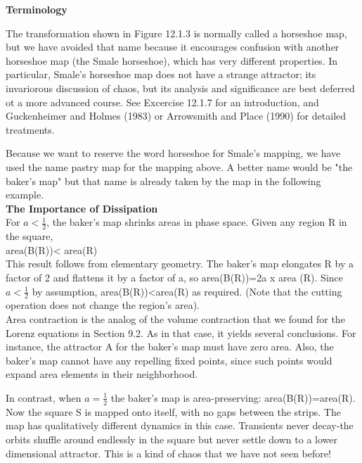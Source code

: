 \documentclass{article}
\newcommand\tab[1][1cm]{\hspace*{#1}}
\begin{document}
\textbf {Terminology} \\ \tab

The transformation shown in Figure 12.1.3 is normally called a horseshoe map, but we have avoided that name because it encourages confusion with another horseshoe map (the Smale horseshoe), which has very different properties. In particular, Smale's horseshoe map does not have a strange attractor; its invariorous discussion of chaos, but its analysis and significance are best deferred ot a more advanced course. See Excercise 12.1.7 for an introduction, and Guckenheimer and Holmes (1983) or Arrowsmith and Place (1990) for detailed treatments. \\ \tab

Because we want to reserve the word horseshoe for Smale's mapping, we have used the name pastry map for the mapping above. A better name would be "the baker's map" but that name is already taken by the map in the following example. \\

\textbf{The Importance of Dissipation} \\

For $a< \frac{1}{2}$, the baker's map shrinks areas in phase space. Given any region R in the square, \\ \tab \tab
area(B(R))< area(R) \\

This result follows from elementary geometry. The baker's map elongates R by a factor of 2 and flattens it by a factor of a, so area(B(R))=2a x area (R). Since $a<\frac{1}{2}$ by assumption, area(B(R))<area(R) as required. (Note that the cutting operation does not change the region's area). \\ \tab
Area contraction is the analog of the volume contraction that we found for the Lorenz equations in Section 9.2. As in that case, it yields several conclusions. For instance, the attractor A for the baker's map must have zero area. Also, the baker's map cannot have any repelling fixed points, since such points would expand area elements in their neighborhood. \\ \tab

In contrast, when $a=\frac{1}{2}$ the baker's map is area-preserving: area(B(R))=area(R). Now the square S is mapped onto itself, with no gaps between the strips. The map has qualitatively different dynamics in this case. Transients never decay-the orbits shuffle around endlessly in the square but never settle down to a lower dimensional attractor. This is a kind of chaos that we have not seen before! \\ \tab
\end{document}
